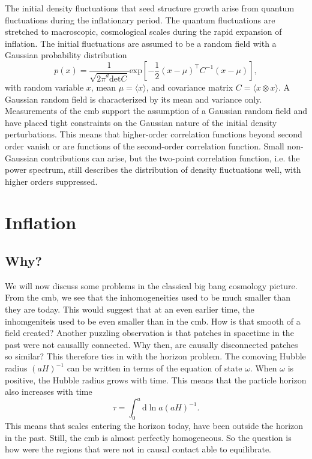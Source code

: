 \documentclass[12pt]{article}
\begin{document}
The initial density fluctuations that seed structure growth arise from quantum fluctuations during the inflationary period. The quantum fluctuations are stretched to macroscopic, cosmological scales during the rapid expansion of inflation. The initial fluctuations are assumed to be a random field with a Gaussian probability distribution
\begin{equation}
    p(x) = \frac{1}{\sqrt{{2\pi}^d \mathrm{det}C}} \mathrm{exp}\left[-\frac{1}{2}\left(x-\mu\right)^\top C^{-1}\left(x-\mu\right)\right],
\end{equation}
with random variable $x$, mean $\mu=\langle x\rangle$, and covariance matrix $C = \langle x \otimes x\rangle $. A Gaussian random field is characterized by its mean and variance only. Measurements of the cmb support the assumption of a Gaussian random field and have placed tight constraints on the Gaussian nature of the initial density perturbations. This means that higher-order correlation functions beyond second order vanish or are functions of the second-order correlation function. Small non-Gaussian contributions can arise, but the two-point correlation function, i.e. the power spectrum, still describes the distribution of density fluctuations well, with higher orders suppressed. 


\section{Inflation}
\subsection{Why?}
We will    now discuss some problems in the classical big bang cosmology picture. From the cmb, we see that the inhomogeneities used to be much smaller than they are today. This would suggest that at an even earlier time, the inhomgeniteis used to be even smaller than in the cmb. How is that smooth of a field created? Another puzzling observation is that patches in spacetime in the past were not causallly connected. Why then, are causally disconnected patches so similar? This therefore ties in with the horizon problem. The comoving Hubble radius $(aH)^{-1}$ can be written in terms of the equation of state $\omega$. When $\omega$ is positive, the Hubble radius grows with time. This means that the particle horizon also increases with time 
\begin{equation}
    \tau = \int_{0}^{a}\mathrm{d}\ln a (aH)^{-1}.
\end{equation}
This means that scales entering the horizon today, have been outside the horizon in the past. Still, the cmb is almost perfectly homogeneous. So the question is how were the regions that were not in causal contact able to equilibrate.
\end{document}
